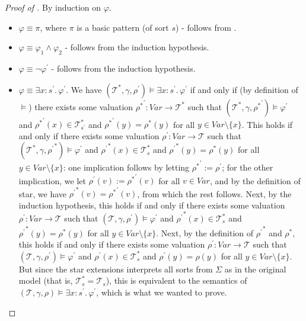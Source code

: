 \begin{proof}[Proof of ]
By induction on $\varphi$.
\begin{itemize}
    \item $\varphi \equiv \pi$, where $\pi$ is a basic pattern (of sort $s$) - follows from .
    \item $\varphi \equiv \varphi_1 \land \varphi_2$ - follows from the induction hypothesis.
    \item $\varphi \equiv \neg \varphi^\prime$ - follows from the induction hypothesis.
    \item $\varphi \equiv \exists x : s^\prime.\, \varphi^\prime$. We have
    $ (\mathcal{T}^*, \gamma, \rho^\prime) \vDash \exists x : s^\prime.\, \varphi^\prime $
    if and only if (by definition of $\vDash$)
    there exists some valuation ${\rho^*}^\prime : \mathit{Var} \to \mathcal{T}^*$ such that
    $(\mathcal{T}^*, \gamma, {\rho^*}^\prime) \vDash \varphi^\prime$
    and ${\rho^*}^\prime(x) \in \mathcal{T}^*_{s^\prime}$
    and ${\rho^*}^\prime(y) = \rho^*(y)$ for all $y \in \mathit{Var} \setminus \{ x \}$.
    This holds if and only if
    there exists some valuation $\rho^{\prime} : \mathit{Var} \to \mathcal{T}$ such that
    $(\mathcal{T}^*, \gamma, {\rho^{\prime}}^*) \vDash \varphi^\prime$
    and ${\rho^{\prime}}^*(x) \in \mathcal{T}^*_s$
    and ${\rho^{\prime}}^*(y) = \rho^*(y)$ for all $y \in \mathit{Var} \setminus \{ x \}$:
    one implication follows by letting ${\rho^*}^\prime := \rho^{\prime}$;
    for the other implication, we let $\rho^{\prime}(v) := {\rho^*}^\prime(v)$ for all $v \in \mathit{Var}$,
    and by the definition of star, we have ${\rho^{\prime}}^*(v) = {\rho^*}^\prime(v)$, from which the rest follows.
    Next, by the induction hypothesis, this holds if and only if
    there exists some valuation $\rho^{\prime} : \mathit{Var} \to \mathcal{T}$ such that
    $(\mathcal{T}, \gamma, {\rho^{\prime}}) \vDash \varphi^\prime$
    and ${\rho^{\prime}}^*(x) \in \mathcal{T}^*_s$
    and ${\rho^{\prime}}^*(y) = \rho^*(y)$ for all $y \in \mathit{Var} \setminus \{ x \}$.
    Next, by the definition of ${\rho^\prime}^*$ and $\rho^*$, this holds if and only if
    there exists some valuation $\rho^{\prime} : \mathit{Var} \to \mathcal{T}$ such that
    $(\mathcal{T}, \gamma, {\rho^{\prime}}) \vDash \varphi^\prime$
    and ${\rho^{\prime}}(x) \in \mathcal{T}^*_s$
    and ${\rho^{\prime}}(y) = \rho(y)$ for all $y \in \mathit{Var} \setminus \{ x \}$.
    But since the star extensions interprets all sorts from $\Sigma$ as in the original model
    (that is, $\mathcal{T}^*_s = \mathcal{T}_s$),
    this is equivalent to the semantics of $(\mathcal{T}, \gamma, \rho) \vDash \exists x:s^\prime.\, \varphi^\prime$,
    which is what we wanted to prove.


\end{itemize}
\end{proof}

